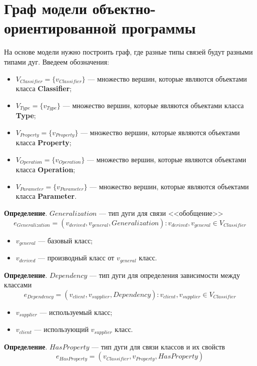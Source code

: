 \section{Граф модели объектно-ориентированной программы}

На основе модели нужно построить граф, где разные типы связей будут разными типами дуг.
Введеем обозначения:
\begin{itemize}
\item $V_{Classifier} = \{ v_{Classifier} \}$ --- множество вершин, которые являются объектами класса \textbf{Classifier};
\item $V_{Type} = \{ v_{Type} \}$ --- множество вершин, которые являются объектами класса \textbf{Type};
\item $V_{Property} = \{ v_{Property} \}$ --- множество вершин, которые являются объектами класса \textbf{Property};
\item $V_{Operation} = \{ v_{Operation} \}$ --- множество вершин, которые являются объектами класса \textbf{Operation};
\item $V_{Parameter} = \{ v_{Parameter} \}$ --- множество вершин, которые являются объектами класса \textbf{Parameter}.
\end{itemize}

\textbf{Определение}. $Generalization$ --- тип дуги для связи <<обобщение>>
%
$$e_{Generalization} = (v_{derived}, v_{general}, Generalization) : v_{derived}, v_{general} \in V_{Classifier}$$

\begin{itemize}
\item $v_{general}$ --- базовый класс;
\item $v_{derived}$ --- производный класс от $v_{general}$ класс.
\end{itemize}

\textbf{Определение}. $Dependency$ --- тип дуги для определения зависимости
между классами
%
$$e_{Dependency} = (v_{client}, v_{supplier}, Dependency) : v_{client}, v_{supplier} \in V_{Classifier}$$

\begin{itemize}
\item $v_{supplier}$ --- используемый класс;
\item $v_{client}$ --- использующий $v_{supplier}$ класс.
\end{itemize}

\textbf{Определение}. $HasProperty$ --- тип дуги для связи классов и их свойств
%
$$e_{HasProperty} = (v_{Classifier}, v_{Property}, HasProperty)$$

